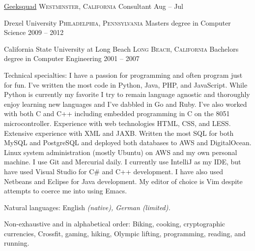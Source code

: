 \documentclass[10pt,a4paper]{article}
\begin{document}
\headedsection
  {\href{http://www.geeksquad.com/}{Geeksquad}}
  {\textsc{Westminster, California}} {%
  \headedsubsection
  { Consultant}
    {Aug -- Jul}
    {}
}



\spacedhrule{-0.2em}{-0.4em}


\headedsection
  {Drexel University}
  {\textsc{Philadelphia, Pennsylvania}} {%
  \headedsubsection
    {Masters degree in Computer Science}
    {2009 -- 2012}
    {}
}

\headedsection
  {California State University at Long Beach}
  {\textsc{Long Beach, California}} {%
  \headedsubsection
    {Bachelors degree in Computer Engineering}
    {2001 -- 2007} 
    {}
}

\spacedhrule{0.5em}{-0.4em}


\inlineheadsection  %
  {Technical specialties:}
  {I have a passion for programming and often program just for fun. I've written the
  most code in Python, Java, PHP, and JavaScript. While Python is currently my 
  favorite I try to remain language agnostic and thoroughly enjoy learning new
  languages and I've dabbled in {Go} and {Ruby}. I've also worked with both C and C++ including embedded programming
  in C on the 8051 microcontroller. Experience with web 
  technologies {HTML}, {CSS}, and {LESS}. Extensive experience with
  {XML} and {JAXB}. Written the most {SQL} for both {MySQL} and {PostgreSQL} and
  deployed both databases to {AWS} and {DigitalOcean}. Linux system
  administration (mostly Ubuntu) on {AWS} and my own personal machine. 
  I use {Git} and Mercurial daily. I currently use IntelliJ as my IDE, but have used Visual 
  Studio for {C\#} and {C++} development. I have also used {Netbeans} and 
  {Eclipse} for Java development. My editor of choice is Vim despite 
  attempts to coerce me into using Emacs.}

\inlineheadsection
  {Natural languages:}
  {English \emph{(native), German \emph{(limited)}.}}


\spacedhrule{1.6em}{-0.4em}


\inlineheadsection
  {Non-exhaustive and in alphabetical order:}
  {Biking, cooking, cryptographic currencies, Crossfit, gaming, hiking, 
  Olympic lifting, programming, reading, and running.}
\end{document}
